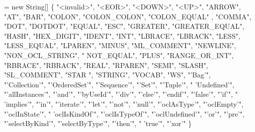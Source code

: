\begin{DoxyCode}
= \textcolor{keyword}{new} String[] \{
        \textcolor{stringliteral}{"<invalid>"}, \textcolor{stringliteral}{"<EOR>"}, \textcolor{stringliteral}{"<DOWN>"}, \textcolor{stringliteral}{"<UP>"}, \textcolor{stringliteral}{"ARROW"}, \textcolor{stringliteral}{"AT"}, \textcolor{stringliteral}{"BAR"}, \textcolor{stringliteral}{"COLON"}, \textcolor{stringliteral}{"COLON\_COLON"}, \textcolor{stringliteral}{"COLON\_EQUAL"}
      , \textcolor{stringliteral}{"COMMA"}, \textcolor{stringliteral}{"DOT"}, \textcolor{stringliteral}{"DOTDOT"}, \textcolor{stringliteral}{"EQUAL"}, \textcolor{stringliteral}{"ESC"}, \textcolor{stringliteral}{"GREATER"}, \textcolor{stringliteral}{"GREATER\_EQUAL"}, \textcolor{stringliteral}{"HASH"}, \textcolor{stringliteral}{"HEX\_DIGIT"}, \textcolor{stringliteral}{"IDENT"}, \textcolor{stringliteral}{"INT"},
       \textcolor{stringliteral}{"LBRACE"}, \textcolor{stringliteral}{"LBRACK"}, \textcolor{stringliteral}{"LESS"}, \textcolor{stringliteral}{"LESS\_EQUAL"}, \textcolor{stringliteral}{"LPAREN"}, \textcolor{stringliteral}{"MINUS"}, \textcolor{stringliteral}{"ML\_COMMENT"}, \textcolor{stringliteral}{"NEWLINE"}, \textcolor{stringliteral}{"NON\_OCL\_STRING"}, \textcolor{stringliteral}{"
      NOT\_EQUAL"}, \textcolor{stringliteral}{"PLUS"}, \textcolor{stringliteral}{"RANGE\_OR\_INT"}, \textcolor{stringliteral}{"RBRACE"}, \textcolor{stringliteral}{"RBRACK"}, \textcolor{stringliteral}{"REAL"}, \textcolor{stringliteral}{"RPAREN"}, \textcolor{stringliteral}{"SEMI"}, \textcolor{stringliteral}{"SLASH"}, \textcolor{stringliteral}{"SL\_COMMENT"}, \textcolor{stringliteral}{"STAR
      "}, \textcolor{stringliteral}{"STRING"}, \textcolor{stringliteral}{"VOCAB"}, \textcolor{stringliteral}{"WS"}, \textcolor{stringliteral}{"'Bag'"}, \textcolor{stringliteral}{"'Collection'"}, \textcolor{stringliteral}{"'OrderedSet'"}, \textcolor{stringliteral}{"'Sequence'"}, \textcolor{stringliteral}{"'Set'"}, \textcolor{stringliteral}{"'Tuple'"}, \textcolor{stringliteral}{"
      'Undefined'"}, \textcolor{stringliteral}{"'allInstances'"}, \textcolor{stringliteral}{"'and'"}, \textcolor{stringliteral}{"'byUseId'"}, \textcolor{stringliteral}{"'div'"}, \textcolor{stringliteral}{"'else'"}, \textcolor{stringliteral}{"'endif'"}, \textcolor{stringliteral}{"'false'"}, \textcolor{stringliteral}{"'if'"}, \textcolor{stringliteral}{"
      'implies'"}, \textcolor{stringliteral}{"'in'"}, \textcolor{stringliteral}{"'iterate'"}, \textcolor{stringliteral}{"'let'"}, \textcolor{stringliteral}{"'not'"}, \textcolor{stringliteral}{"'null'"}, \textcolor{stringliteral}{"'oclAsType'"}, \textcolor{stringliteral}{"'oclEmpty'"}, \textcolor{stringliteral}{"'oclInState'"}, \textcolor{stringliteral}{"
      'oclIsKindOf'"}, \textcolor{stringliteral}{"'oclIsTypeOf'"}, \textcolor{stringliteral}{"'oclUndefined'"}, \textcolor{stringliteral}{"'or'"}, \textcolor{stringliteral}{"'pre'"}, \textcolor{stringliteral}{"'selectByKind'"}, \textcolor{stringliteral}{"'selectByType'"}, \textcolor{stringliteral}{"'then'"}, \textcolor{stringliteral}{"
      'true'"}, \textcolor{stringliteral}{"'xor'"}
    \}
\end{DoxyCode}


